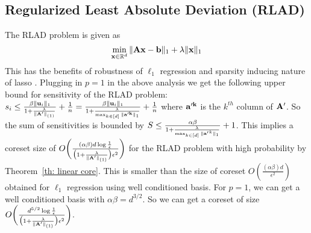 \subsection{Regularized Least Absolute Deviation (RLAD)}
The RLAD problem is given as 
\begin{equation*}
\min _{\mathbf{x} \in \mathbb{R}^d} \|\mathbf{Ax} - \mathbf{b}\|_1 + \lambda \|\mathbf{x}\|_1\\
\end{equation*}
% 
This has the benefits of robustness of $\ell_1$ regression and sparsity inducing nature of lasso \cite{wang2006regularized}. Plugging in $p=1$ in the above analysis we get the following upper bound for sensitivity of the RLAD problem: 
$s_i \leq \frac{\beta\|\mathbf{u}_i\|_1}{1+ \frac{\lambda}{\|\mathbf{A'}\|_{(1)}}}+\frac{1}{n} = \frac{\beta\|\mathbf{u}_i\|_1}{1+ \frac{\lambda}{\max_{k \in [d]}\mathbf{\|a'^{k}}\|_1}} + \frac{1}{n}$ where $\mathbf{a'^k}$ is the $k^{th}$ column of $\mathbf{A'}$. So the sum of sensitivities is bounded by $S \leq \frac{\alpha\beta}{1+ \frac{\lambda}{\max_{k \in [d]}\mathbf{\|a'}^{k}\|_1}} +1 $. This implies a coreset size of  ${O}\bigg(\frac{(\alpha\beta)d\log{\frac{1}{\epsilon}}}{\big(1+\frac{\lambda}{\|\mathbf{A'}\|_{(1)}}\big)\epsilon^2}\bigg)$ for the RLAD problem with high probability by Theorem~\ref{th: linear core}. This is smaller than the size of coreset ${O}(\frac{(\alpha\beta)d}{\epsilon^2})$ obtained for $\ell_1$ regression using well conditioned basis. For $p=1$, we can get a well conditioned basis with $\alpha\beta=d^{3/2}$. So we can get a coreset of size $O\bigg(\frac{d^{5/2}\log{\frac{1}{\epsilon}}}{\big(1+\frac{\lambda}{\|\mathbf{A'}\|_{(1)}}\big)\epsilon^2}\bigg)$.
% 

